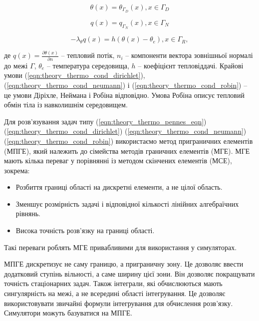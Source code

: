 \begin{equation}
  \label{eqn:theory_thermo_cond_dirichlet}
  \theta(x) = \theta_{\Gamma_D}(x), x \in \Gamma_D
\end{equation}

\begin{equation}
  \label{eqn:theory_thermo_cond_neumann}
  q(x) = q_{\Gamma_N}(x), x \in \Gamma_N
\end{equation}

\begin{equation}
  \label{eqn:theory_thermo_cond_robin}
  -\lambda_\theta q(x) = h(\theta(x) - \theta_e), x \in \Gamma_R,
\end{equation}

\noindent де $q(x) = \frac{\partial \theta(x)}{\partial n}$ -- тепловий потік, $n_i$ -- компоненти вектора зовнішньої
нормалі до межі $\Gamma$, $\theta_e$ -- температура середовища, $h$ -- коефіцієнт тепловіддачі. Крайові умови
(\ref{eqn:theory_thermo_cond_dirichlet}), (\ref{eqn:theory_thermo_cond_neumann}) і (\ref{eqn:theory_thermo_cond_robin})
-- це умови Діріхле, Неймана і Робіна відповідно. Умова Робіна описує тепловий обмін тіла із навколишнім середовищем.

Для розв'язування задач типу (\ref{eqn:theory_thermo_pennes_eqn}) (\ref{eqn:theory_thermo_cond_dirichlet})
(\ref{eqn:theory_thermo_cond_neumann}) (\ref{eqn:theory_thermo_cond_robin}) використаємо метод приграничних елементів
(МПГЕ)\cite{grytsko-cobem}, який належить до сімейства методів граничних елементів (МГЕ)\cite{brebbia-bem}. МГЕ мають
кілька переваг у порівнянні із методом скінчених елементів (МСЕ)\cite{bahvalov-et-al}, зокрема:
\begin{itemize}
  \item Розбиття границі області на дискретні елементи, а не цілої область.
  \item Зменшує розмірність задачі і відповідної кількості лінійних алгебраїчних рівнянь.
  \item Висока точність розв'язку на границі області.
\end{itemize}
Такі переваги роблять МГЕ привабливими для використання у симуляторах.

МПГЕ дискретизує не саму границю, а приграничну зону. Це дозволяє ввести додатковий ступінь вільності, а саме ширину
цієї зони. Він дозволяє покращувати точність стаціонарних задач. Також інтеграли, які обчислюються мають сингулярність
на межі, а не всередині області інтегрування. Це дозволяє використовувати звичайні формули інтегрування для обчислення
розв'язку. Симулятори можуть базуватися на МПГЕ.

